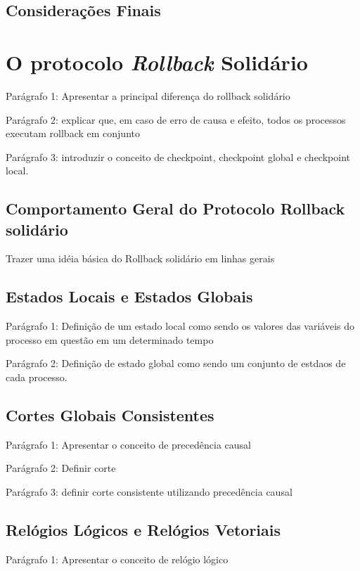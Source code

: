 \subsection{Considerações Finais}


\section{O protocolo \textit{Rollback} Solidário}

Parágrafo 1: Apresentar a principal diferença do rollback solidário

Parágrafo 2: explicar que, em caso de erro de causa e efeito, todos os processos executam rollback em conjunto

Parágrafo 3: introduzir o conceito de checkpoint, checkpoint global e checkpoint local.

\subsection{Comportamento Geral do Protocolo Rollback solidário}

Trazer uma idéia básica do Rollback solidário em linhas gerais

\subsection{Estados Locais e Estados Globais}

Parágrafo 1: Definição de um estado local como sendo os valores das variáveis do processo em questão em um determinado tempo

Parágrafo 2: Definição de estado global como sendo um conjunto de estdaos de cada processo.

\subsection{Cortes Globais Consistentes}

Parágrafo 1: Apresentar o conceito de precedência causal

Parágrafo 2: Definir corte 

Parágrafo 3: definir corte consistente utilizando precedência causal

\subsection{Relógios Lógicos e Relógios Vetoriais}

Parágrafo 1: Apresentar o conceito de relógio lógico

